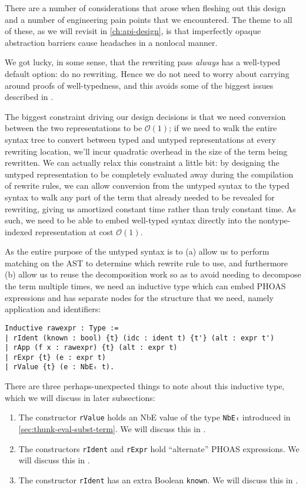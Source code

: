 There are a number of considerations that arose when fleshing out this design and a number of engineering pain points that we encountered.
The theme to all of these, as we will revisit in \autoref{ch:api-design}, is that imperfectly opaque abstraction barriers cause headaches in a nonlocal manner.

We got lucky, in some sense, that the rewriting pass \emph{always} has a well-typed default option: do no rewriting.
Hence we do not need to worry about carrying around proofs of well-typedness, and this avoids some of the biggest issues described in .

The biggest constraint driving our design decisions is that we need conversion between the two representations to be $\mathcal{O}(1)$; if we need to walk the entire syntax tree to convert between typed and untyped representations at every rewriting location, we'll incur quadratic overhead in the size of the term being rewritten.
We can actually relax this constraint a little bit: by designing the untyped representation to be completely evaluated away during the compilation of rewrite rules, we can allow conversion from the untyped syntax to the typed syntax to walk any part of the term that already needed to be revealed for rewriting, giving us amortized constant time rather than truly constant time.
As such, we need to be able to embed well-typed syntax directly into the nontype-indexed representation at cost $\mathcal{O}(1)$.

As the entire purpose of the untyped syntax is to (a) allow us to perform matching on the AST to determine which rewrite rule to use, and furthermore (b) allow us to reuse the decomposition work so as to avoid needing to decompose the term multiple times, we need an inductive type which can embed PHOAS expressions and has separate nodes for the structure that we need, namely application and identifiers:

\begin{verbatim}
Inductive rawexpr : Type :=
| rIdent (known : bool) {t} (idc : ident t) {t'} (alt : expr t')
| rApp (f x : rawexpr) {t} (alt : expr t)
| rExpr {t} (e : expr t)
| rValue {t} (e : NbEₜ t).
\end{verbatim}
\label{sec:rewriting-more:rawexpr-def}%
There are three perhaps-unexpected things to note about this inductive type, which we will discuss in later subsections:
\begin{enumerate}
\item
  The constructor \texttt{rValue} holds an NbE value of the type \texttt{NbEₜ} introduced in \autoref{sec:thunk-eval-subst-term}.
  We will discuss this in .
\item
  The constructors \texttt{rIdent} and \texttt{rExpr} hold ``alternate'' PHOAS expressions.
  We will discuss this in .
\item
  The constructor \texttt{rIdent} has an extra Boolean \texttt{known}.
  We will discuss this in .
\end{enumerate}

